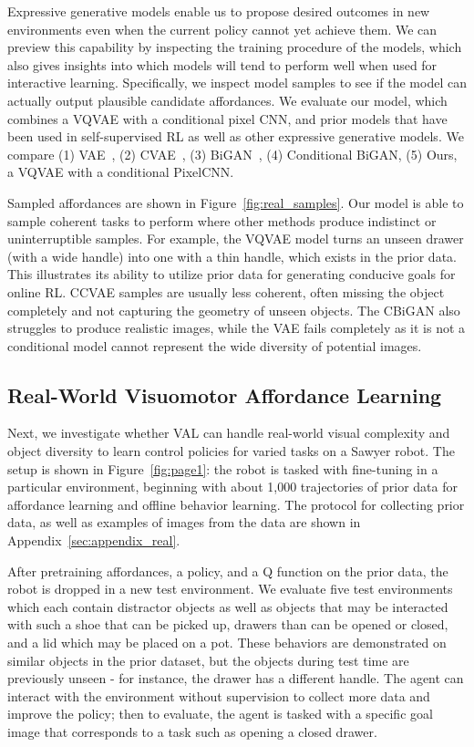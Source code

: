 \documentclass[letterpaper, 10 pt, conference]{ieeeconf}  %
\begin{document}
Expressive generative models enable us to propose desired outcomes in new environments even when the current policy cannot yet achieve them.
We can preview this capability by inspecting the training procedure of the models,
which also gives insights into which models will tend to perform well when used for interactive learning.
Specifically, we inspect model samples to see if the model can actually output plausible candidate affordances.
We evaluate our model, which combines a VQVAE with a conditional pixel CNN, and prior models that have been used in self-supervised RL as well as other expressive generative models.
We compare (1) VAE~\cite{kingma2014vae}, (2) CVAE~\cite{sohn2015cvae}, (3) BiGAN~\cite{donahue2017bigan}, (4) Conditional BiGAN, (5) Ours, a VQVAE with a conditional PixelCNN.

Sampled affordances are shown in Figure~\ref{fig:real_samples}. Our model is able to sample coherent tasks to perform where other methods produce indistinct or uninterruptible samples. For example, the VQVAE model turns an unseen drawer (with a wide handle) into one with a thin handle, which exists in the prior data. This  illustrates its ability to utilize prior data for generating conducive goals for online RL. CCVAE samples are usually less coherent, often missing the object completely and not capturing the geometry of unseen objects. The CBiGAN also struggles to produce realistic images, while the VAE fails completely as it is not a conditional model cannot represent the wide diversity of potential images.

\subsection{Real-World Visuomotor Affordance Learning}

Next, we investigate whether VAL can handle real-world visual complexity and object diversity to learn control policies for varied tasks on a Sawyer robot.
The setup is shown in Figure~\ref{fig:page1}: the robot is tasked with fine-tuning in a particular environment, beginning with about 1,000 trajectories of prior data for affordance learning and offline behavior learning.
The protocol for collecting prior data, as well as examples of images from the data are shown in Appendix~\ref{sec:appendix_real}.

After pretraining affordances, a policy, and a Q function on the prior data, the robot is dropped in a new test environment. We evaluate five test environments which each contain distractor objects as well as objects that may be interacted with such a shoe that can be picked up, drawers than can be opened or closed, and a lid which may be placed on a pot. These behaviors are demonstrated on similar objects in the prior dataset, but the objects during test time are previously unseen - for instance, the drawer has a different handle. The agent can interact with the environment without supervision to collect more data and improve the policy; then to evaluate, the agent is tasked with a specific goal image that corresponds to a task such as opening a closed drawer.
\end{document}
